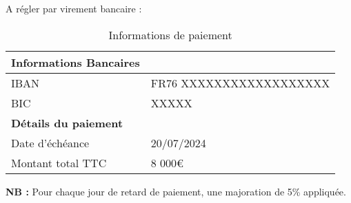 \documentclass[11pt, a4paper]{awesome-cv}
\begin{document}
\begin{cvletter}
A régler par virement bancaire : 

\begin{table}[h!]
    \centering
    \tablefont
    \caption{Informations de paiement}
    \medskip
    \color{tabletext} %
    \begin{tabular}{|p{6cm}|C{7cm}|}
        \hline
        \rule{0pt}{2.5ex} \textbf{Informations Bancaires} & \\
        \hline
        \rule{0pt}{2.5ex} IBAN & FR76 XXXXXXXXXXXXXXXXXX \\
        \hline
        \rule{0pt}{2.5ex} BIC & XXXXX \\
        \hline
        \rule{0pt}{2.5ex} \textbf{Détails du paiement} & \\
        \hline
        \rule{0pt}{2.5ex} Date d'échéance & 20/07/2024 \\
        \hline
        \rule{0pt}{2.5ex} Montant total TTC & 8 000€ \\
        \hline
    \end{tabular}
\end{table}

\medskip

\textbf{NB :} Pour chaque jour de retard de paiement, une majoration de 5\% appliquée.

\end{cvletter}

\makeletterclosing
\end{document}
